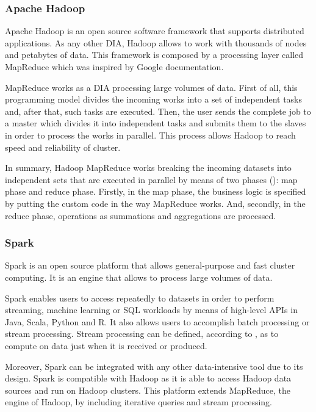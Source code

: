 \subsubsection{Apache Hadoop}

Apache Hadoop is an open source software framework that supports distributed applications. As any other DIA, Hadoop allows to work with thousands of nodes and petabytes of data. This framework is composed by a processing layer called MapReduce which was inspired by Google documentation.

MapReduce works as a DIA processing large volumes of data. First of all, this programming model divides the incoming works into a set of independent tasks and, after that, such tasks are executed. Then, the user sends the complete job to a master which divides it into independent tasks and submits them to the slaves in order to process the works in parallel. This process allows Hadoop to reach speed and reliability of cluster.

In summary, Hadoop MapReduce works breaking the incoming datasets into independent sets that are executed in parallel by means of two phases (\cite{hadoopwebsite}): map phase and reduce phase. Firstly, in the map phase, the business logic is specified by putting the custom code in the way MapReduce works. And, secondly, in the reduce phase, operations as summations and aggregations are processed.

\subsubsection{Spark}

Spark is an open source platform that allows general-purpose and fast cluster computing. It is an engine that allows to process large volumes of data.

Spark enables users to access repeatedly to datasets in order to perform streaming, machine learning or SQL workloads by means of high-level APIs in Java, Scala, Python and R. It also allows users to accomplish batch processing or stream processing. Stream processing can be defined, according to \cite{streamprocessing}, as to compute on data just when it is received or produced.

Moreover, Spark can be integrated with any other data-intensive tool due to its design. Spark is compatible with Hadoop as it is able to access Hadoop data sources and run on Hadoop clusters. This platform extends MapReduce, the engine of Hadoop, by including iterative queries and stream processing.

